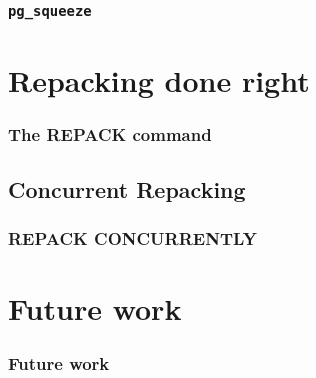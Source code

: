 \begin{frame}
        \frametitle{\texttt{pg\_squeeze}}
\end{frame}


\section{Repacking done right}
\begin{frame}
	\frametitle{The REPACK command}
\end{frame}

\subsection{Concurrent Repacking}
\begin{frame}
	\frametitle{REPACK CONCURRENTLY}

%
%
%
%
\end{frame}


\section{Future work}
\begin{frame}
  \frametitle{Future work}
\end{frame}
